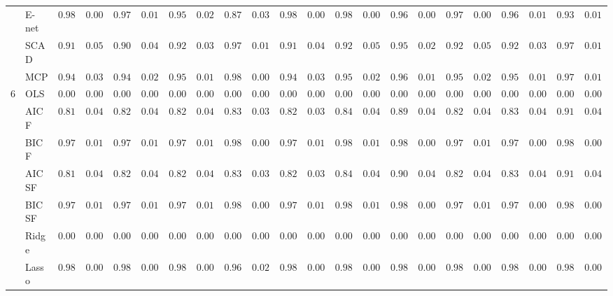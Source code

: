 \begin{tabular}{ll|ll|llllll|llllll|llllll}
 & E-net  & $0.9860$ & $0.0065$ & $0.9765$ & $0.0136$ & $0.9548$ & $0.0262$ & $0.8768$ & $0.0311$ & $0.9852$ & $0.0070$ & $0.9809$ & $0.0095$ & $0.9696$ & $0.0079$ & $0.9792$ & $0.0082$ & $0.9685$ & $0.0121$ & $0.9320$ & $0.0173$ \\
 & SCAD  & $0.9144$ & $0.0504$ & $0.9076$ & $0.0451$ & $0.9238$ & $0.0327$ & $0.9785$ & $0.0107$ & $0.9138$ & $0.0485$ & $0.9244$ & $0.0516$ & $0.9544$ & $0.0288$ & $0.9228$ & $0.0506$ & $0.9272$ & $0.0323$ & $0.9702$ & $0.0196$ \\
 & MCP  & $0.9483$ & $0.0345$ & $0.9439$ & $0.0255$ & $0.9562$ & $0.0197$ & $0.9809$ & $0.0089$ & $0.9468$ & $0.0361$ & $0.9568$ & $0.0276$ & $0.9694$ & $0.0164$ & $0.9514$ & $0.0295$ & $0.9559$ & $0.0197$ & $0.9791$ & $0.0119$ \\\hline
6 & OLS  & $0.0000$ & $0.0000$ & $0.0000$ & $0.0000$ & $0.0000$ & $0.0000$ & $0.0000$ & $0.0000$ & $0.0000$ & $0.0000$ & $0.0000$ & $0.0000$ & $0.0000$ & $0.0000$ & $0.0000$ & $0.0000$ & $0.0000$ & $0.0000$ & $0.0000$ & $0.0000$ \\
 & AIC F  & $0.8105$ & $0.0412$ & $0.8216$ & $0.0420$ & $0.8236$ & $0.0457$ & $0.8323$ & $0.0377$ & $0.8239$ & $0.0384$ & $0.8416$ & $0.0421$ & $0.8984$ & $0.0444$ & $0.8242$ & $0.0431$ & $0.8373$ & $0.0481$ & $0.9121$ & $0.0466$ \\
 & BIC F  & $0.9788$ & $0.0104$ & $0.9765$ & $0.0111$ & $0.9775$ & $0.0110$ & $0.9801$ & $0.0091$ & $0.9768$ & $0.0105$ & $0.9802$ & $0.0113$ & $0.9840$ & $0.0080$ & $0.9757$ & $0.0119$ & $0.9799$ & $0.0089$ & $0.9853$ & $0.0075$ \\
 & AIC SF  & $0.8114$ & $0.0407$ & $0.8220$ & $0.0421$ & $0.8251$ & $0.0444$ & $0.8332$ & $0.0377$ & $0.8245$ & $0.0380$ & $0.8443$ & $0.0411$ & $0.9015$ & $0.0422$ & $0.8254$ & $0.0421$ & $0.8389$ & $0.0465$ & $0.9122$ & $0.0466$ \\
 & BIC SF  & $0.9788$ & $0.0104$ & $0.9765$ & $0.0111$ & $0.9775$ & $0.0110$ & $0.9801$ & $0.0091$ & $0.9768$ & $0.0105$ & $0.9802$ & $0.0113$ & $0.9840$ & $0.0080$ & $0.9757$ & $0.0119$ & $0.9799$ & $0.0089$ & $0.9854$ & $0.0072$ \\
 & Ridge  & $0.0000$ & $0.0000$ & $0.0000$ & $0.0000$ & $0.0000$ & $0.0000$ & $0.0000$ & $0.0000$ & $0.0000$ & $0.0000$ & $0.0000$ & $0.0000$ & $0.0000$ & $0.0000$ & $0.0000$ & $0.0000$ & $0.0000$ & $0.0000$ & $0.0000$ & $0.0000$ \\
 & Lasso  & $0.9895$ & $0.0000$ & $0.9892$ & $0.0023$ & $0.9889$ & $0.0023$ & $0.9697$ & $0.0214$ & $0.9895$ & $0.0000$ & $0.9894$ & $0.0011$ & $0.9872$ & $0.0049$ & $0.9895$ & $0.0000$ & $0.9893$ & $0.0015$ & $0.9824$ & $0.0098$ \\

\end{tabular}
